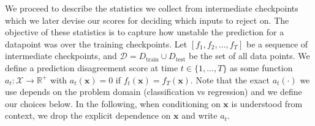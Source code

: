 

We proceed to describe the statistics we collect from intermediate checkpoints which we later devise our scores for deciding which inputs to reject on. The objective of these statistics is to capture how unstable the prediction for a datapoint was over the training checkpoints. Let $[f_1,f_2,\ldots, f_T]$ be a sequence of intermediate checkpoints, and $\mathcal{D} = D_\text{train} \cup D_\text{test}$ be the set of all data points. We define a prediction disagreement score at time $t \in \{1,\ldots,T\}$ as some %
function $a_t: \mathcal{X} \rightarrow \mathbb{R}^+$  %
with $a_t(\bm{x}) = 0$ if $f_t(\bm{x}) = f_T(\bm{x})$. %
Note that the exact $a_t(\cdot)$ we use depends on the problem domain (classification vs regression) and we define our choices below. In the following, when conditioning on $\bm{x}$ is understood from context, we drop the explicit dependence on $\bm{x}$ and write $a_t$.






